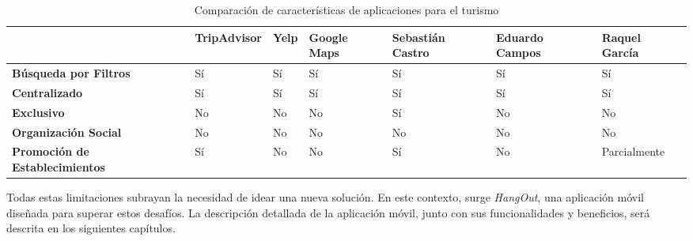 \begin{landscape}
    \begin{table}
        \centering
        \caption{Comparación de características de aplicaciones para el turismo}
        \label{tab:comparison}
        \small
        \begin{tabularx}{\linewidth}{|X|X|X|X|X|X|X|}
            \hline
                                                   & \textbf{TripAdvisor} & \textbf{Yelp} & \textbf{Google Maps} & \textbf{Sebastián Castro} & \textbf{Eduardo Campos} & \textbf{Raquel García} \\ \hline
            \textbf{Búsqueda por Filtros}          & Sí                   & Sí            & Sí                   & Sí                        & Sí                      & Sí                     \\ \hline
            \textbf{Centralizado}                  & Sí                   & Sí            & Sí                   & Sí                        & Sí                      & Sí                     \\ \hline
            \textbf{Exclusivo}                     & No                   & No            & No                   & Sí                        & No                      & No                     \\ \hline
            \textbf{Organización Social}           & No                   & No            & No                   & No                        & No                      & No                     \\ \hline
            \textbf{Promoción de Establecimientos} & Sí                   & No            & No                   & Sí                        & No                      & Parcialmente           \\ \hline
        \end{tabularx}
    \end{table}
\end{landscape}

Todas estas limitaciones subrayan la necesidad de idear una nueva solución. En este contexto, surge \textit{HangOut}, una aplicación móvil diseñada para superar estos desafíos. La descripción detallada de la aplicación móvil, junto con sus funcionalidades y beneficios, será descrita en los siguientes capítulos.



